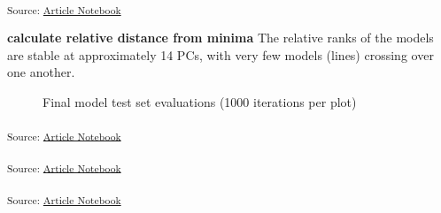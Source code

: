 \documentclass[
]{agujournal2019}
\begin{document}
\textsubscript{Source:
\href{https://rvcrawford.github.io/glowing-system/index.qmd.html}{Article
Notebook}}

\textbf{calculate relative distance from minima} The relative ranks of
the models are stable at approximately 14 PCs, with very few models
(lines) crossing over one another.

\label{cell-fig-final-metric-boxplot}
\begin{figure}[H]


\caption{\label{fig-final-metric-boxplot}Final model test set
evaluations (1000 iterations per plot)}

\end{figure}%

\textsubscript{Source:
\href{https://rvcrawford.github.io/glowing-system/index.qmd.html}{Article
Notebook}}

\textsubscript{Source:
\href{https://rvcrawford.github.io/glowing-system/index.qmd.html}{Article
Notebook}}

\textsubscript{Source:
\href{https://rvcrawford.github.io/glowing-system/index.qmd.html}{Article
Notebook}}
\end{document}
